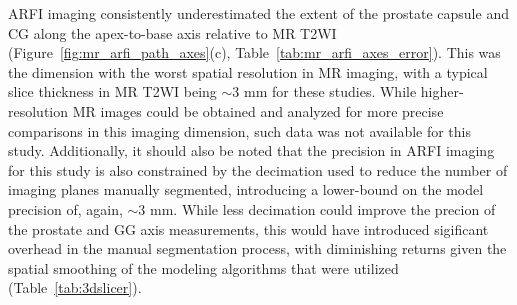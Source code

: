 ARFI imaging consistently underestimated the extent of the prostate capsule and
CG along the apex-to-base axis relative to MR T2WI
(Figure~\ref{fig:mr_arfi_path_axes}(c), Table~\ref{tab:mr_arfi_axes_error}).
This was the dimension with the worst spatial resolution in MR imaging, with a
typical slice thickness in MR T2WI being $\sim$3 mm for these studies.  While
higher-resolution MR images could be obtained and analyzed for more precise
comparisons in this imaging dimension, such data was not available for this
study.  Additionally, it should also be noted that the precision in ARFI
imaging for this study is also constrained by the decimation used to reduce the
number of imaging planes manually segmented, introducing a lower-bound on the
model precision of, again, $\sim$3 mm.  While less decimation could improve the
precion of the prostate and GG axis measurements, this would have introduced
sigificant overhead in the manual segmentation process, with diminishing
returns given the spatial smoothing of the modeling algorithms that were
utilized (Table~\ref{tab:3dslicer}).
